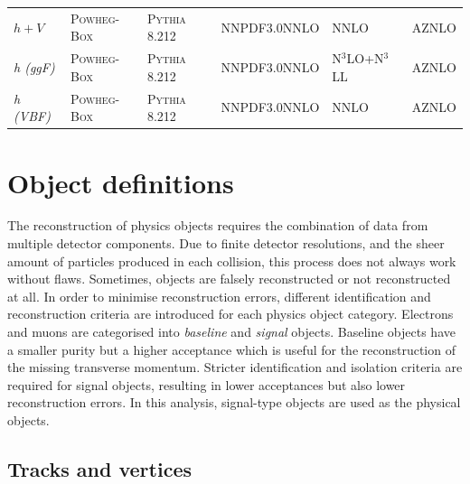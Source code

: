 \begin{table}
{\begin{tabular} {llllll}
	$h+V$ & \textsc{Powheg-Box} & \textsc{Pythia} 8.212 & NNPDF3.0NNLO & NNLO~\cite{deFlorian:2016spz} & AZNLO \\
	\textit{h (ggF)} & \textsc{Powheg-Box} & \textsc{Pythia} 8.212 & NNPDF3.0NNLO & N$^3$LO+N$^3$LL~\cite{deFlorian:2016spz} & AZNLO \\
	\textit{h (VBF)} & \textsc{Powheg-Box} & \textsc{Pythia} 8.212 & NNPDF3.0NNLO & NNLO~\cite{deFlorian:2016spz} & AZNLO \\
	\bottomrule
	\end{tabular}}\vspace{3mm}
	\label{tab:mc_generators}   
\end{table}

\section{Object definitions}

The reconstruction of physics objects requires the combination of data from multiple detector components. Due to finite detector resolutions, and the sheer amount of particles produced in each collision, this process does not always work without flaws. Sometimes, objects are falsely reconstructed or not reconstructed at all. In order to minimise reconstruction errors, different identification and reconstruction criteria are introduced for each physics object category. Electrons and muons are categorised into \textit{baseline} and \textit{signal} objects. Baseline objects have a smaller purity but a higher acceptance which is \eg useful for the reconstruction of the missing transverse momentum. Stricter identification and isolation criteria are required for signal objects, resulting in lower acceptances but also lower reconstruction errors. In this analysis, signal-type objects are used as the physical objects.

\subsection{Tracks and vertices}

